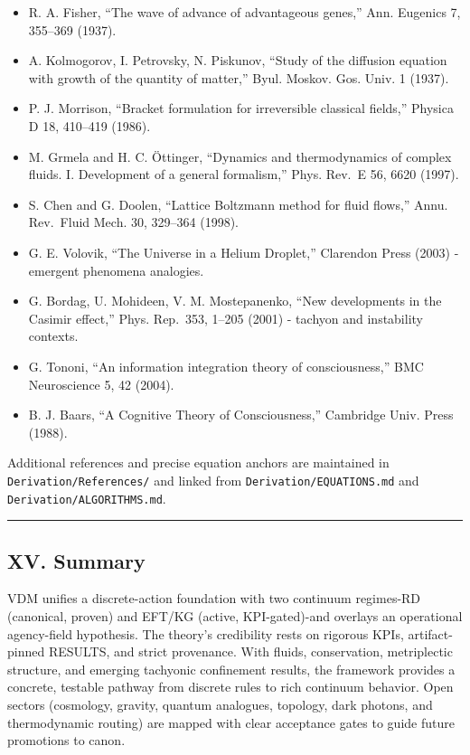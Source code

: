 \documentclass[
]{article}
\providecommand{\tightlist}{%
  \setlength{\itemsep}{0pt}\setlength{\parskip}{0pt}}
\begin{document}
\begin{itemize}
\tightlist
\item
  R. A. Fisher, ``The wave of advance of advantageous genes,'' Ann.
  Eugenics 7, 355--369 (1937).
\item
  A. Kolmogorov, I. Petrovsky, N. Piskunov, ``Study of the diffusion
  equation with growth of the quantity of matter,'' Byul. Moskov. Gos.
  Univ. 1 (1937).
\item
  P. J. Morrison, ``Bracket formulation for irreversible classical
  fields,'' Physica D 18, 410--419 (1986).
\item
  M. Grmela and H. C. Öttinger, ``Dynamics and thermodynamics of complex
  fluids. I. Development of a general formalism,'' Phys. Rev.~E 56, 6620
  (1997).
\item
  S. Chen and G. Doolen, ``Lattice Boltzmann method for fluid flows,''
  Annu. Rev.~Fluid Mech. 30, 329--364 (1998).
\item
  G. E. Volovik, ``The Universe in a Helium Droplet,'' Clarendon Press
  (2003) - emergent phenomena analogies.
\item
  G. Bordag, U. Mohideen, V. M. Mostepanenko, ``New developments in the
  Casimir effect,'' Phys. Rep.~353, 1--205 (2001) - tachyon and
  instability contexts.
\item
  G. Tononi, ``An information integration theory of consciousness,'' BMC
  Neuroscience 5, 42 (2004).
\item
  B. J. Baars, ``A Cognitive Theory of Consciousness,'' Cambridge Univ.
  Press (1988).
\end{itemize}

Additional references and precise equation anchors are maintained in
\texttt{Derivation/References/} and linked from
\texttt{Derivation/EQUATIONS.md} and \texttt{Derivation/ALGORITHMS.md}.

\begin{center}\rule{0.5\linewidth}{0.5pt}\end{center}

\hypertarget{xv.-summary}{%
\subsection{XV. Summary}\label{xv.-summary}}

VDM unifies a discrete-action foundation with two continuum regimes-RD
(canonical, proven) and EFT/KG (active, KPI-gated)-and overlays an
operational agency-field hypothesis. The theory's credibility rests on
rigorous KPIs, artifact-pinned RESULTS, and strict provenance. With
fluids, conservation, metriplectic structure, and emerging tachyonic
confinement results, the framework provides a concrete, testable pathway
from discrete rules to rich continuum behavior. Open sectors (cosmology,
gravity, quantum analogues, topology, dark photons, and thermodynamic
routing) are mapped with clear acceptance gates to guide future
promotions to canon.
\end{document}
